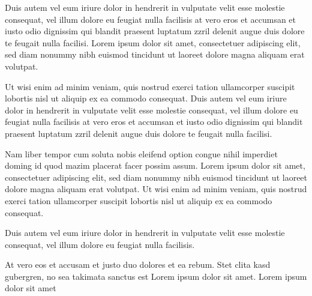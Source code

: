\documentclass[]{../metanetpaper}
\begin{document}
\begin{Parallel}[c]{80mm}{80mm}
{    Duis autem vel eum iriure dolor in hendrerit in vulputate velit esse molestie consequat, vel illum dolore eu feugiat nulla facilisis at vero eros et accumsan et iusto odio dignissim qui blandit praesent luptatum zzril delenit augue duis dolore te feugait nulla facilisi. Lorem ipsum dolor sit amet, consectetuer adipiscing elit, sed diam nonummy nibh euismod tincidunt ut laoreet dolore magna aliquam erat volutpat.   

    Ut wisi enim ad minim veniam, quis nostrud exerci tation ullamcorper suscipit lobortis nisl ut aliquip ex ea commodo consequat. Duis autem vel eum iriure dolor in hendrerit in vulputate velit esse molestie consequat, vel illum dolore eu feugiat nulla facilisis at vero eros et accumsan et iusto odio dignissim qui blandit praesent luptatum zzril delenit augue duis dolore te feugait nulla facilisi.   

    Nam liber tempor cum soluta nobis eleifend option congue nihil imperdiet doming id quod mazim placerat facer possim assum. Lorem ipsum dolor sit amet, consectetuer adipiscing elit, sed diam nonummy nibh euismod tincidunt ut laoreet dolore magna aliquam erat volutpat. Ut wisi enim ad minim veniam, quis nostrud exerci tation ullamcorper suscipit lobortis nisl ut aliquip ex ea commodo consequat.   

    Duis autem vel eum iriure dolor in hendrerit in vulputate velit esse molestie consequat, vel illum dolore eu feugiat nulla facilisis.   

    At vero eos et accusam et justo duo dolores et ea rebum. Stet clita kasd gubergren, no sea takimata sanctus est Lorem ipsum dolor sit amet. Lorem ipsum dolor sit amet
  }

\end{Parallel}
\end{document}
